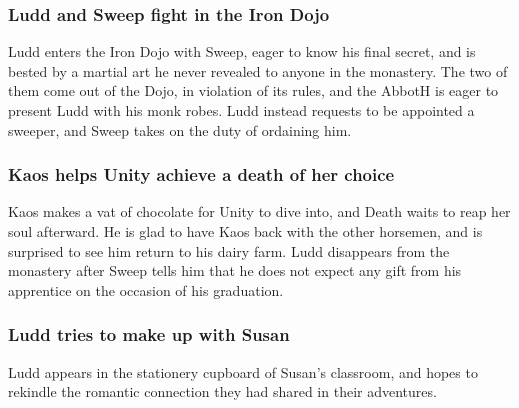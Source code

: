 \subsubsection{\Gls{Ludd} and \Gls{Sweep} fight in the Iron Dojo}
\Gls{Ludd} enters the Iron Dojo with \Gls{Sweep}, eager to know his final secret, and is bested by
a martial art he never revealed to anyone in the monastery. The two of them come out of the Dojo,
in violation of its rules, and the \Gls{AbbotH} is eager to present \Gls{Ludd} with his monk robes.
\Gls{Ludd} instead requests to be appointed a sweeper, and \Gls{Sweep} takes on the duty of
ordaining him.

\subsubsection{\Gls{Kaos} helps \Gls{Unity} achieve a death of her choice}
\Gls{Kaos} makes a vat of chocolate for \Gls{Unity} to dive into, and \Gls{Death} waits to reap her
soul afterward. He is glad to have \Gls{Kaos} back with the other horsemen, and is surprised to see
him return to his dairy farm. \Gls{Ludd} disappears from the monastery after \Gls{Sweep} tells him
that he does not expect any gift from his apprentice on the occasion of his graduation.

\subsubsection{\Gls{Ludd} tries to make up with \Gls{Susan}}
\Gls{Ludd} appears in the stationery cupboard of \Gls{Susan}'s classroom, and hopes to rekindle
the romantic connection they had shared in their adventures.